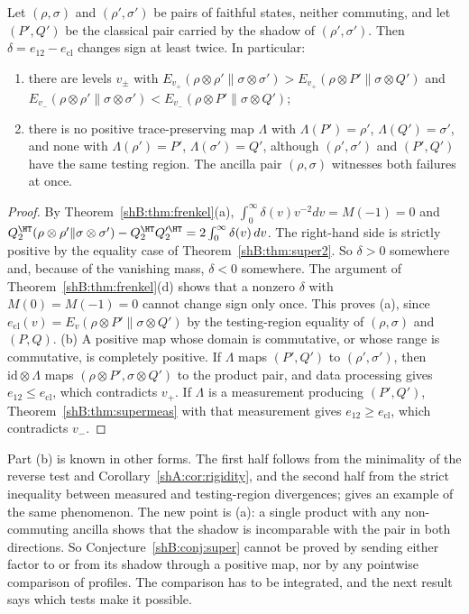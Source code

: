 \begin{proposition}\label{shB:prop:twosided}
Let $(\rho,\sigma)$ and $(\rho',\sigma')$ be pairs of faithful states, neither commuting, and let $(P',Q')$ be the classical pair carried by the shadow of $(\rho',\sigma')$. Then $\delta=e_{12}-e_{\mathrm{cl}}$ changes sign at least twice. In particular:
\begin{enumerate}[label=(\alph*)]
\item there are levels $v_\pm$ with $E_{v_+}(\rho\otimes\rho'\|\sigma\otimes\sigma')>E_{v_+}(\rho\otimes P'\|\sigma\otimes Q')$ and $E_{v_-}(\rho\otimes\rho'\|\sigma\otimes\sigma')<E_{v_-}(\rho\otimes P'\|\sigma\otimes Q')$;
\item there is no positive trace-preserving map $\Lambda$ with $\Lambda(P')=\rho'$, $\Lambda(Q')=\sigma'$, and none with $\Lambda(\rho')=P'$, $\Lambda(\sigma')=Q'$, although $(\rho',\sigma')$ and $(P',Q')$ have the same testing region. The ancilla pair $(\rho,\sigma)$ witnesses both failures at once.
\end{enumerate}
\end{proposition}

\begin{proof}
By Theorem~\ref{shB:thm:frenkel}(a), $\int_0^\infty\delta(v)v^{-2}dv=M(-1)=0$ and $Q^\HT_2(\rho\otimes\rho'\|\sigma\otimes\sigma')-Q^\HT_2Q'^\HT_2=2\int_0^\infty\delta(v)\,dv$. The right-hand side is strictly positive by the equality case of Theorem~\ref{shB:thm:super2}. So $\delta>0$ somewhere and, because of the vanishing mass, $\delta<0$ somewhere. The argument of Theorem~\ref{shB:thm:frenkel}(d) shows that a nonzero $\delta$ with $M(0)=M(-1)=0$ cannot change sign only once. This proves (a), since $e_{\mathrm{cl}}(v)=E_v(\rho\otimes P'\|\sigma\otimes Q')$ by the testing-region equality of $(\rho,\sigma)$ and $(P,Q)$. (b) A positive map whose domain is commutative, or whose range is commutative, is completely positive. If $\Lambda$ maps $(P',Q')$ to $(\rho',\sigma')$, then $\mathrm{id}\otimes\Lambda$ maps $(\rho\otimes P',\sigma\otimes Q')$ to the product pair, and data processing gives $e_{12}\le e_{\mathrm{cl}}$, which contradicts $v_+$. If $\Lambda$ is a measurement producing $(P',Q')$, Theorem~\ref{shB:thm:supermeas} with that measurement gives $e_{12}\ge e_{\mathrm{cl}}$, which contradicts $v_-$.
\end{proof}

Part (b) is known in other forms. The first half follows from the minimality of the reverse test \cite{Matsumoto2018newf} and Corollary~\ref{shA:cor:rigidity}, and the second half from the strict inequality between measured and testing-region divergences; \cite{Matsumoto2014} gives an example of the same phenomenon. The new point is (a): a single product with any non-commuting ancilla shows that the shadow is incomparable with the pair in both directions. So Conjecture~\ref{shB:conj:super} cannot be proved by sending either factor to or from its shadow through a positive map, nor by any pointwise comparison of profiles. The comparison has to be integrated, and the next result says which tests make it possible.

